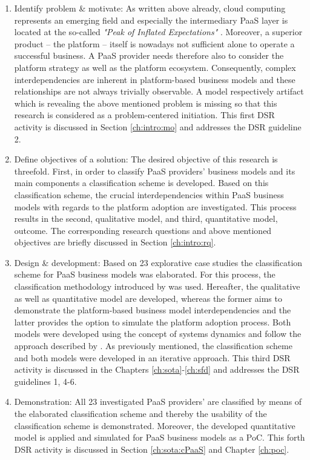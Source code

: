 \begin{enumerate}
	\item Identify problem \& motivate: As written above already, cloud computing represents an emerging field and especially the intermediary \ac{PaaS} layer is located at the so-called \textit{"Peak of Inflated Expectations"} \citep[p. 5]{Smith2012}. Moreover, a superior product -- the platform -- itself is nowadays not sufficient alone to operate a successful business. A \ac{PaaS} provider needs therefore also to consider the platform strategy as well as the platform ecosystem. Consequently, complex interdependencies are inherent in platform-based business models and these relationships are not always trivially observable. A model respectively artifact which is revealing the above mentioned problem is missing so that this research is considered as a problem-centered initiation. This first \ac{DSR} activity is discussed in Section \ref{ch:intro:mo} and addresses the \ac{DSR} guideline 2.
	\item Define objectives of a solution: The desired objective of this research is threefold. First, in order to classify \ac{PaaS} providers' business models and its main components a classification scheme is developed. Based on this classification scheme, the crucial interdependencies within \ac{PaaS} business models with regards to the platform adoption are investigated. This process results in the second, qualitative model, and third, quantitative model, outcome. The corresponding research questions and above mentioned objectives are briefly discussed in Section \ref{ch:intro:rq}.
	\item Design \& development: Based on 23 explorative case studies the classification scheme for \ac{PaaS} business models was elaborated. For this process, the classification methodology introduced by \citet{Fettke2003} was used. Hereafter, the qualitative as well as quantitative model are developed, whereas the former aims to demonstrate the platform-based business model interdependencies and the latter provides the option to simulate the platform adoption process. Both models were developed using the concept of systems dynamics and follow the approach described by \citet{Sterman2000}. As previously mentioned, the classification scheme and both models were developed in an iterative approach. This third \ac{DSR} activity is discussed in the Chapters \ref{ch:sota}-\ref{ch:sfd} and addresses the \ac{DSR} guidelines 1, 4-6.
	\item Demonstration: All 23 investigated \ac{PaaS} providers' are classified by means of the elaborated classification scheme and thereby the usability of the classification scheme is demonstrated. Moreover, the developed quantitative model is applied and simulated for \ac{PaaS} business models as a \ac{PoC}. This forth \ac{DSR} activity is discussed in Section \ref{ch:sota:cPaaS} and Chapter \ref{ch:poc}.

\end{enumerate}

